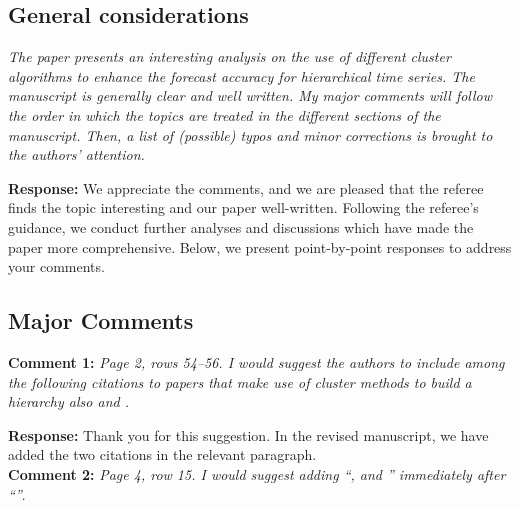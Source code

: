 \documentclass{article}
\numberwithin{equation}{section}
\theoremstyle{plain}
\theoremstyle{definition}
\theoremstyle{remark}
\begin{document}


\subsection*{General considerations}

\textit{The paper presents an interesting analysis on the use of different cluster algorithms to enhance the forecast accuracy for hierarchical time series. The manuscript is generally clear and well written. My major comments will follow the order in which the topics are treated in the different sections of the manuscript. Then, a list of (possible) typos and minor corrections is brought to the authors’ attention.}

\medskip
\noindent \textbf{Response:} We appreciate the comments, and we are pleased that the referee finds the topic interesting and our paper well-written. Following the referee's guidance, we conduct further analyses and discussions which have made the paper more comprehensive. Below, we present point-by-point responses to address your comments. 

\subsection*{Major Comments}
\textbf{Comment 1:} \textit{Page 2, rows 54--56. I would suggest the authors to include among the following citations to papers that make use of cluster methods to build a hierarchy also \cite{yang2017reconciling}
 and \cite{cini2023graph}.}



\medskip
\noindent \textbf{Response:} {Thank you for this suggestion. In the revised manuscript, we have added the two citations in the relevant paragraph. } \\



\textbf{Comment 2:} \textit{Page 4, row 15. I would suggest adding ``, and \citealp{di2024forecast}''
immediately after ``\citealp{hollymanUnderstandingForecastReconciliation2021}''}.
\end{document}
